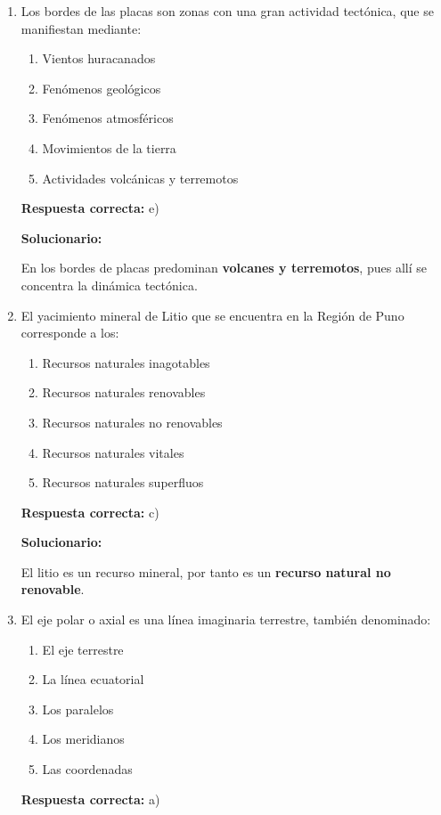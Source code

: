\begin{enumerate}[resume]

	
	\item Los bordes de las placas son zonas con una gran actividad tectónica, que se manifiestan mediante:
	\begin{enumerate}[label=\alph*)]
		\item Vientos huracanados
		\item Fenómenos geológicos
		\item Fenómenos atmosféricos
		\item Movimientos de la tierra
		\item Actividades volcánicas y terremotos
	\end{enumerate}
	\textbf{Respuesta correcta:} e)
	
	\vspace{2mm}
	\textbf{Solucionario:}
	
	En los bordes de placas predominan \textbf{volcanes y terremotos}, pues allí se concentra la dinámica tectónica.
	
	\vspace{6mm}
	
	\item El yacimiento mineral de Litio que se encuentra en la Región de Puno corresponde a los:
	\begin{enumerate}[label=\alph*)]
		\item Recursos naturales inagotables
		\item Recursos naturales renovables
		\item Recursos naturales no renovables
		\item Recursos naturales vitales
		\item Recursos naturales superfluos
	\end{enumerate}
	\textbf{Respuesta correcta:} c)
	
	\vspace{2mm}
	\textbf{Solucionario:}
	
	El litio es un recurso mineral, por tanto es un \textbf{recurso natural no renovable}.
	
	\vspace{6mm}
	
	\item El eje polar o axial es una línea imaginaria terrestre, también denominado:
	\begin{enumerate}[label=\alph*)]
		\item El eje terrestre
		\item La línea ecuatorial
		\item Los paralelos
		\item Los meridianos
		\item Las coordenadas
	\end{enumerate}
	\textbf{Respuesta correcta:} a)
	

\end{enumerate}
